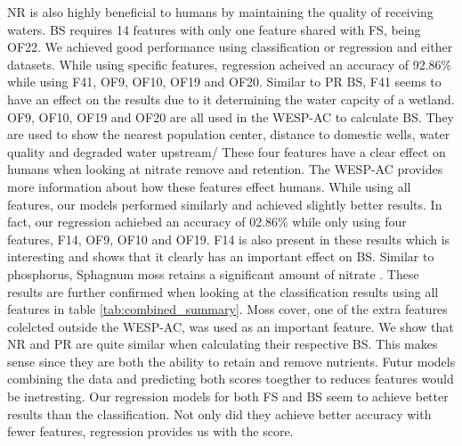 \documentclass[12pt,letterpaper]{article}
\begin{document}
NR is also highly beneficial to humans by maintaining the quality of receiving waters.
\ac{BS} requires 14 features with only one feature shared with \ac{FS}, being OF22.
We achieved good performance using classification or regression and either datasets.
While using specific features, regression acheived an accuracy of 92.86\% while using F41, OF9, OF10, OF19 and OF20.
Similar to \ac{PR} \ac{BS}, F41 seems to have an effect on the results due to it determining the water capcity of a wetland.
OF9, OF10, OF19 and OF20 are all used in the WESP-AC to calculate \ac{BS}.
They are used to show the nearest population center, distance to domestic wells, water quality and degraded water upstream/
These four features have a clear effect on humans when looking at nitrate remove and retention.
The WESP-AC provides more information about how these features effect humans.
While using all features, our models performed similarly and achieved slightly better results.
In fact, our regression achiebed an accuracy of 02.86\% while only using four features, F14, OF9, OF10 and OF19.
F14 is also present in these results which is interesting and shows that it clearly has an important effect on \ac{BS}.
Similar to phosphorus, Sphagnum moss  retains a significant amount of nitrate \cite{williams1999nitrogen}.
These results are further confirmed when looking at the classification results using all features in table \ref{tab:combined_summary}.
Moss cover, one of the extra features colelcted outside the WESP-AC, was used as an important feature.
We show that \ac{NR} and \ac{PR} are quite similar when calculating their respective \ac{BS}.
This makes sense since they are both the ability to retain and remove nutrients.
Futur models combining the data and predicting both scores toegther to reduces features would be inetresting.
Our regression models for both \ac{FS} and \ac{BS} seem to achieve better results than the classification.
Not only did they achieve better accuracy with fewer features, regression provides us with the score.
\end{document}
